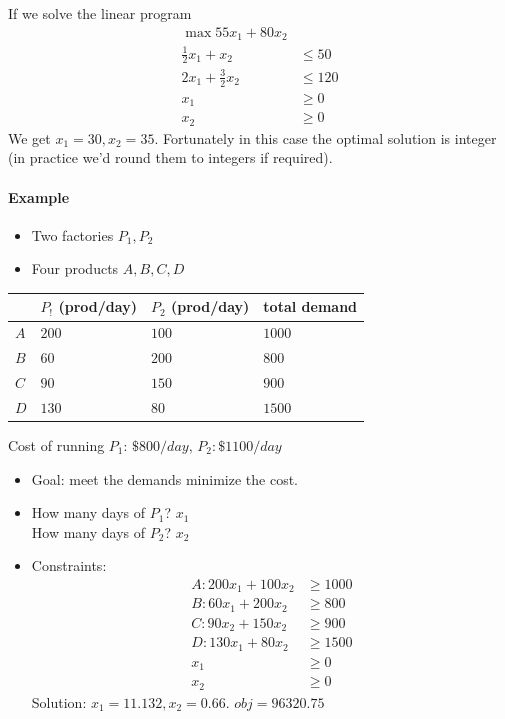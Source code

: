 \documentclass[12 pt]{article}
\begin{document}
        If we solve the linear program
        \begin{align*}
          \max 55x_1 + 80x_2
            \\ \frac{1}{2}x_1 + x_2 & \leq 50
            \\ 2x_1 + \frac{3}{2}x_2 & \leq 120 
            \\ x_1 & \geq 0 
            \\ x_2 & \geq 0
        \end{align*}
        We get $x_1 = 30, x_2 = 35$. Fortunately in this case the
        optimal solution is integer (in practice we'd round them to
        integers if required).
        \paragraph{Example}
        \begin{itemize}
        \item Two factories $P_1, P_2$
        \item Four products $A,B,C,D$
        \end{itemize}
        \begin{tabular}{l | l l l}
          &$P_!$ (prod/day)& $P_2$ (prod/day)& total demand
          \\ \hline $A$ & $200$ & $100$ &$1000$
          \\ $B$ & $60$ & $200$ & $800$
          \\ $C$ & $90$ & $150$ & $900$
          \\ $D$ & $130$ & $80$ & $1500$
        \end{tabular} Cost of running $P_1$: $\$800/day$, $P_2:
        \$1100/day$
        \begin{itemize}
        \item Goal: meet the demands minimize the cost.
        \item How many days of $P_1$? $x_1$
          \\ How many days of $P_2$? $x_2$
        \item Constraints:
          \begin{align*}
            A: 200x_1 + 100 x_2 & \geq 1000
          \\B: 60 x_1 + 200 x_2 & \geq 800
          \\ C: 90x_2 + 150 x_2 & \geq 900
            \\ D: 130 x_1 + 80x_2 & \geq 1500
            \\ x_1 & \geq 0
            \\ x_2 & \geq 0
          \end{align*}
          Solution: $x_1 = 11.132, x_2 = 0.66$. $obj=96320.75$
        \end{itemize}
        
\end{document}
